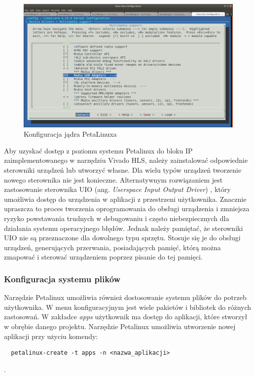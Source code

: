 \begin{figure}[!h]
  \centering
  \includegraphics[width=\textwidth]{img/petalinux-config-kernel.png}
  \caption{Konfiguracja jądra PetaLinuxa}
  \label{petalinux-config-kernel}
\end{figure}

Aby uzyskać dostęp z poziomu systemu Petalinux do bloku IP zaimplementowanego w narzędziu Vivado HLS, należy 
zainstalować odpowiednie sterowniki urządzeń lub utworzyć własne. Dla wielu typów urządzeń tworzenie nowego sterownika 
nie jest konieczne. Alternatywnym rozwiązaniem jest zastosowanie sterownika UIO (ang. \emph{Userspace Input Output 
Driver}) \cite{uio-drivers}, który umożliwia dostęp do urządzenia w aplikacji z przestrzeni użytkownika. Znacznie 
upraszcza to proces tworzenia oprogramowania do obsługi urządzenia i zmniejsza ryzyko powstawania trudnych w 
debugowaniu i często niebezpiecznych dla działania systemu operacyjnego błędów. Jednak należy pamiętać, że sterowniki 
UIO nie są przeznaczone dla dowolnego typu sprzętu. Stosuje się je do obsługi urządzeń, generujących przerwania, 
posiadających pamięć, którą można zmapować i sterować urządzeniem poprzez pisanie do tej pamięci. 

\subsubsection{Konfiguracja systemu plików}

Narzędzie Petalinux umożliwia również dostosowanie systemu plików do potrzeb użytkownika. W menu konfiguracyjnym jest 
wiele pakietów i bibliotek do różnych zastosowań. W zakładce \emph{apps} użytkownik ma dostęp do aplikacji, które 
stworzył w obrębie danego projektu. Narzędzie Petalinux umożliwia utworzenie nowej aplikacji przy użyciu komendy:
\begin{verbatim}
  petalinux-create -t apps -n <nazwa_aplikacji>
\end{verbatim}.


